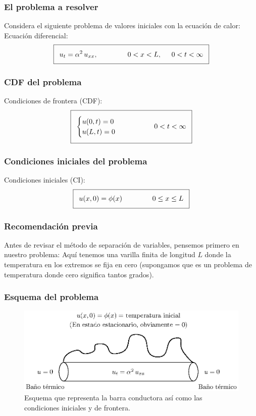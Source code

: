 \documentclass[12pt]{beamer}
\begin{document}
\begin{frame}
\frametitle{El problema a resolver}
Considera el siguiente problema de valores iniciales con la ecuación de calor:
\\
\bigskip
\pause
Ecuación diferencial:
\begin{align*}
\addtolength{\fboxsep}{5pt}\boxed{ u_{t} = \alpha^{2} \, u_{xx}, \hspace{1.5cm} 0 < x < L,\hspace{0.5cm} 0 < t < \infty}
\end{align*}
\end{frame}
\begin{frame}
\frametitle{CDF del problema}
Condiciones de frontera (CDF):
\begin{align*}
\addtolength{\fboxsep}{5pt}\boxed{
\begin{cases}
u(0, t) = 0 \\
u(L, t) = 0
\end{cases}
\hspace{1.5cm}
0 < t < \infty }
\end{align*}
\end{frame}
\begin{frame}
\frametitle{Condiciones iniciales del problema}
Condiciones iniciales (CI):
\begin{align*}
\addtolength{\fboxsep}{5pt}\boxed{
u(x, 0) = \phi (x) \hspace{1.5cm} 0 \leq x \leq L
}
\end{align*}
\end{frame}
\begin{frame}
\frametitle{Recomendación previa}
Antes de revisar el método de separación de variables, pensemos primero en nuestro problema: \pause Aquí tenemos una varilla finita de longitud $L$ donde la temperatura en los extremos se fija en cero (supongamos que es un problema de temperatura donde cero significa tantos grados).
\end{frame}
\begin{frame}
\frametitle{Esquema del problema}
\begin{figure}[H]
    \centering
    \includegraphics[scale=0.9]{Imagenes/Separacion_Variables_00_Barra.eps}
    \caption{Esquema que representa la barra conductora así como las condiciones iniciales y de frontera.}
    \label{fig:figura_barra_01}
\end{figure}
\end{frame}
\end{document}
